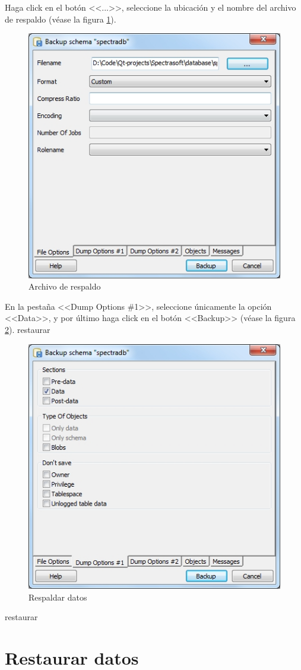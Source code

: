 {Haga click en el bot\'{o}n <<...>>, seleccione la ubicaci\'{o}n y el nombre del archivo de respaldo (v\'{e}ase la figura \ref{fig:respaldar2}).
\vfill
\begin{figure}[H]
  \centering
  \includegraphics[width=.6\linewidth]{./img/respaldar2.jpg}
\caption[]{Archivo de respaldo\label{fig:respaldar2}}
\end{figure}
\vfill

En la pesta\~{n}a <<Dump Options \#1>>, seleccione \'{u}nicamente la opci\'{o}n <<Data>>, y por \'{u}ltimo haga click en el bot\'{o}n <<Backup>> (v\'{e}ase la figura \ref{fig:respaldar3}).
restaurar
\begin{figure}[H]
  \centering
  \includegraphics[width=.6\linewidth]{./img/respaldar3.jpg}
\caption[]{Respaldar datos\label{fig:respaldar3}}
\end{figure}
restaurar
\newpage
\section*{Restaurar datos}

}
